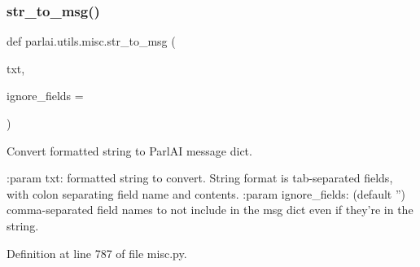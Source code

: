 \subsubsection{\texorpdfstring{str\+\_\+to\+\_\+msg()}{str\_to\_msg()}}
{\footnotesize\ttfamily def parlai.\+utils.\+misc.\+str\+\_\+to\+\_\+msg (\begin{DoxyParamCaption}\item[{}]{txt,  }\item[{}]{ignore\+\_\+fields = {\ttfamily \textquotesingle{}\textquotesingle{}} }\end{DoxyParamCaption})}

\begin{DoxyVerb}Convert formatted string to ParlAI message dict.

:param txt:
    formatted string to convert. String format is tab-separated fields,
    with colon separating field name and contents.
:param ignore_fields:
    (default '') comma-separated field names to not
    include in the msg dict even if they're in the string.
\end{DoxyVerb}
 

Definition at line 787 of file misc.\+py.


